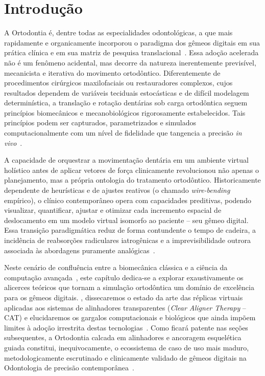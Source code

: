 \section{Introdução}

A Ortodontia é, dentre todas as especialidades odontológicas, a que mais rapidamente e organicamente incorporou o paradigma dos gêmeos digitais em sua prática clínica e em sua matriz de pesquisa translacional~\cite{olawade2026advancing}. Essa adoção acelerada não é um fenômeno acidental, mas decorre da natureza inerentemente previsível, mecanicista e iterativa do movimento ortodôntico. Diferentemente de procedimentos cirúrgicos maxilofaciais ou restauradores complexos, cujos resultados dependem de variáveis teciduais estocásticas e de difícil modelagem determinística, a translação e rotação dentárias sob carga ortodôntica seguem princípios biomecânicos e mecanobiológicos rigorosamente estabelecidos. Tais princípios podem ser capturados, parametrizados e simulados computacionalmente com um nível de fidelidade que tangencia a precisão \textit{in vivo}~\cite{zhang2024recursive}.

A capacidade de orquestrar a movimentação dentária em um ambiente virtual holístico antes de aplicar vetores de força clinicamente revolucionou não apenas o planejamento, mas a própria ontologia do tratamento ortodôntico. Historicamente dependente de heurísticas e de ajustes reativos (o chamado \textit{wire-bending} empírico), o clínico contemporâneo opera com capacidades preditivas, podendo visualizar, quantificar, ajustar e otimizar cada incremento espacial de deslocamento em um modelo virtual isomorfo ao paciente -- seu gêmeo digital. Essa transição paradigmática reduz de forma contundente o tempo de cadeira, a incidência de reabsorções radiculares iatrogênicas e a imprevisibilidade outrora associada às abordagens puramente analógicas~\cite{duggal2026exploring}.

Neste cenário de confluência entre a biomecânica clássica e a ciência da computação avançada~\cite{mdpi2025convergence}, este capítulo dedica-se a explorar exaustivamente os alicerces teóricos que tornam a simulação ortodôntica um domínio de excelência para os gêmeos digitais. , dissecaremos o estado da arte das réplicas virtuais aplicadas aos sistemas de alinhadores transparentes (\textit{Clear Aligner Therapy} -- CAT) e elucidaremos os gargalos computacionais e biológicos que ainda impõem limites à adoção irrestrita destas tecnologias~\cite{li2025impacts, li2024aligner}. Como ficará patente nas seções subsequentes, a Ortodontia calcada em alinhadores e ancoragem esquelética guiada constitui, inequivocamente, o ecossistema de caso de uso mais maduro, metodologicamente escrutinado e clinicamente validado de gêmeos digitais na Odontologia de precisão contemporânea~\cite{techsoc2025precision}.
